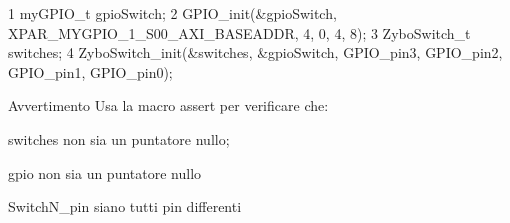 \begin{DoxyCode}
1 myGPIO\_t gpioSwitch;
2 GPIO\_init(&gpioSwitch, XPAR\_MYGPIO\_1\_S00\_AXI\_BASEADDR, 4, 0, 4, 8);
3 ZyboSwitch\_t switches;
4 ZyboSwitch\_init(&switches, &gpioSwitch, GPIO\_pin3, GPIO\_pin2, GPIO\_pin1, GPIO\_pin0);
\end{DoxyCode}


\begin{DoxyWarning}{Avvertimento}
Usa la macro assert per verificare che\+:
\begin{DoxyItemize}
\item switches non sia un puntatore nullo;
\item gpio non sia un puntatore nullo
\item Switch\+N\+\_\+pin siano tutti pin differenti 
\end{DoxyItemize}
\end{DoxyWarning}
